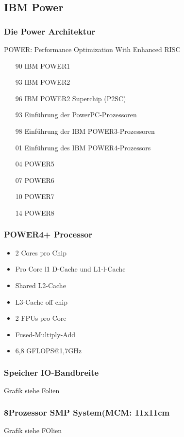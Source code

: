 \subsection{IBM Power}
\subsubsection{Die Power Architektur}
POWER: Performance Optimization With Enhanced RISC
\begin{itemize}
	\item[90] IBM POWER1
	\item[93] IBM POWER2
	\item[96] IBM POWER2 Superchip (P2SC)
	\item[93] Einführung der PowerPC-Prozessoren
	\item[98] Einführung der IBM POWER3-Prozessoren
	\item[01] Einführung des IBM POWER4-Prozessors
	\item[04] POWER5
	\item[07] POWER6
	\item[10] POWER7
	\item[14] POWER8
\end{itemize}
\subsubsection{POWER4+ Processor}
\begin{itemize}
	\item 2 Cores pro Chip
	\item Pro Core l1 D-Cache und L1-l-Cache
	\item Shared L2-Cache
	\item L3-Cache off chip
	\item 2 FPUs pro Core
	\item Fused-Multiply-Add
	\item 6,8 GFLOPS@1,7GHz
\end{itemize}
\subsubsection{Speicher  IO-Bandbreite}
Grafik siehe Folien
\subsubsection{8Prozessor SMP System(MCM: 11x11cm}
Grafik siehe FOlien
